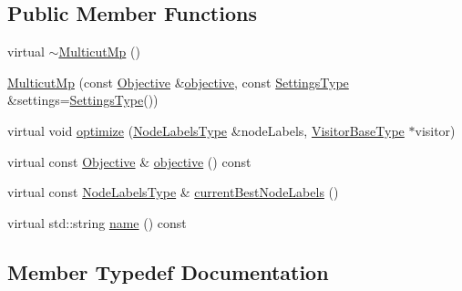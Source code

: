 \subsection*{Public Member Functions}
\begin{DoxyCompactItemize}
\item 
virtual \hyperlink{classnifty_1_1graph_1_1optimization_1_1multicut_1_1MulticutMp_a0d0ee4daf0173097d53f057651393c2b}{$\sim$\+Multicut\+Mp} ()
\item 
\hyperlink{classnifty_1_1graph_1_1optimization_1_1multicut_1_1MulticutMp_aea4a470f1b1e9a3fb77118b8c7b88541}{Multicut\+Mp} (const \hyperlink{classnifty_1_1graph_1_1optimization_1_1multicut_1_1MulticutMp_ad37cbde154954a78f5529f35def24443}{Objective} \&\hyperlink{classnifty_1_1graph_1_1optimization_1_1multicut_1_1MulticutMp_a374e7f1b07f0d9fe23d5587cfa260691}{objective}, const \hyperlink{structnifty_1_1graph_1_1optimization_1_1multicut_1_1MulticutMp_1_1SettingsType}{Settings\+Type} \&settings=\hyperlink{structnifty_1_1graph_1_1optimization_1_1multicut_1_1MulticutMp_1_1SettingsType}{Settings\+Type}())
\item 
virtual void \hyperlink{classnifty_1_1graph_1_1optimization_1_1multicut_1_1MulticutMp_aced55e7998e5c5495d60cd2a801276ca}{optimize} (\hyperlink{classnifty_1_1graph_1_1optimization_1_1multicut_1_1MulticutMp_a4f01b08f609bb54b19098452e1f8bef6}{Node\+Labels\+Type} \&node\+Labels, \hyperlink{classnifty_1_1graph_1_1optimization_1_1multicut_1_1MulticutMp_ac0c55da1b0da06e56bc164f256e811e9}{Visitor\+Base\+Type} $\ast$visitor)
\item 
virtual const \hyperlink{classnifty_1_1graph_1_1optimization_1_1multicut_1_1MulticutMp_ad37cbde154954a78f5529f35def24443}{Objective} \& \hyperlink{classnifty_1_1graph_1_1optimization_1_1multicut_1_1MulticutMp_a374e7f1b07f0d9fe23d5587cfa260691}{objective} () const 
\item 
virtual const \hyperlink{classnifty_1_1graph_1_1optimization_1_1multicut_1_1MulticutMp_a4f01b08f609bb54b19098452e1f8bef6}{Node\+Labels\+Type} \& \hyperlink{classnifty_1_1graph_1_1optimization_1_1multicut_1_1MulticutMp_a0ed06f920c05dfc539437fef3a7726a4}{current\+Best\+Node\+Labels} ()
\item 
virtual std\+::string \hyperlink{classnifty_1_1graph_1_1optimization_1_1multicut_1_1MulticutMp_a4c37caddd5aebe80dede9635a312b9b3}{name} () const 
\end{DoxyCompactItemize}


\subsection{Member Typedef Documentation}
\hypertarget{classnifty_1_1graph_1_1optimization_1_1multicut_1_1MulticutMp_aa1b1a033f9090852c7c4529eec9623ef}{}
